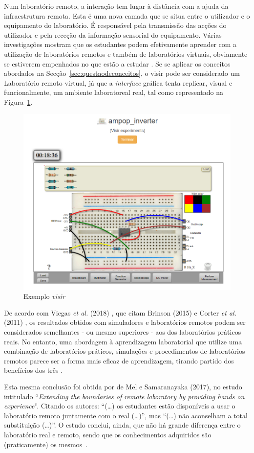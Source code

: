 Num \acrshort{laboratório remoto}, a interação tem lugar à distância com a ajuda da infraestrutura remota. Esta é uma nova camada que se situa entre o utilizador e o equipamento do laboratório. É responsável pela transmissão das acções do utilizador e pela receção da informação sensorial do equipamento.
Várias investigações mostram que os estudantes podem efetivamente aprender com a utilização de laboratórios remotos e também de laboratórios virtuais, obviamente se estiverem empenhados no que estão a estudar \cite{RemoteLabsImpactVISIR}. Se se aplicar os conceitos abordados na Secção~\ref{sec:questaodeconceitos}, o \acrshort{visir} pode ser considerado um Laboratório remoto virtual, já que a \textit{interface} gráfica tenta replicar, visual e funcionalmente, um ambiente laboratoreal real, tal como representado na Figura~\ref{fig:exemplo_visir}. 

\begin{figure}[hbtp]
    \centering
    \includegraphics[width=0.4\linewidth]{figures/visir_sch.png}
    \caption{Exemplo \textit{\acrshort{visir}}}
    \label{fig:exemplo_visir}
\end{figure}

De acordo com Viegas \textit{et al.} (2018) \cite{ImpactRemoteLabTeachingPractices}, que citam Brinson (2015) \cite{BRINSON2015218} e Corter \textit{et al.} (2011) \cite{CORTER20112054}, os resultados obtidos com simuladores e laboratórios remotos podem ser considerados semelhantes - ou mesmo superiores - aos dos laboratórios práticos reais. No entanto, uma abordagem à aprendizagem laboratorial que utilize uma combinação de laboratórios práticos, simulações e procedimentos de laboratórios remotos parece ser a forma mais eficaz de aprendizagem, tirando partido dos benefícios dos três \cite{BRINSON2015218}.

Esta mesma conclusão foi obtida por de Mel e Samaranayaka (2017), no estudo intitulado ``\textit{Extending the boundaries of remote laboratory by providing hands on experience}''. Citando os autores: ``(\ldots) os estudantes estão disponíveis a usar o \acrshort{laboratório remoto} juntamente com o real (\ldots)'', mas ``(\ldots) não aconselham a total substituição (\ldots)''. O estudo conclui, ainda, que não há grande diferença entre o laboratório real e remoto, sendo que os conhecimentos adquiridos são (praticamente) os mesmos~\cite{deMel}.

